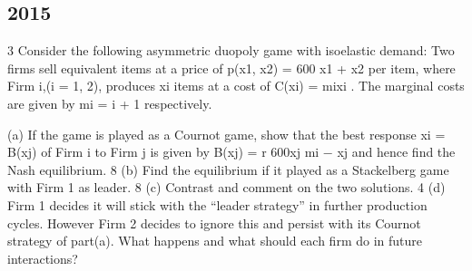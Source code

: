 \documentclass[]{report}
\begin{document}
\subsection{2015}
3 Consider the following asymmetric duopoly game with isoelastic demand:
Two firms sell equivalent items at a price of
p(x1, x2) = 600
x1 + x2
per item, where Firm i,(i = 1, 2), produces xi
items at a cost of
C(xi) = mixi
.
The marginal costs are given by mi = i + 1 respectively.

(a) If the game is played as a Cournot game, show that the best response
xi = B(xj) of Firm i to Firm j is given by
B(xj) = r
600xj
mi
− xj
and hence find the Nash equilibrium. 8
(b) Find the equilibrium if it played as a Stackelberg game with Firm 1 as
leader. 8
(c) Contrast and comment on the two solutions. 4
(d) Firm 1 decides it will stick with the “leader strategy” in further production
cycles. However Firm 2 decides to ignore this and persist with
its Cournot strategy of part(a). What happens and what should each
firm do in future interactions?
\end{document}
